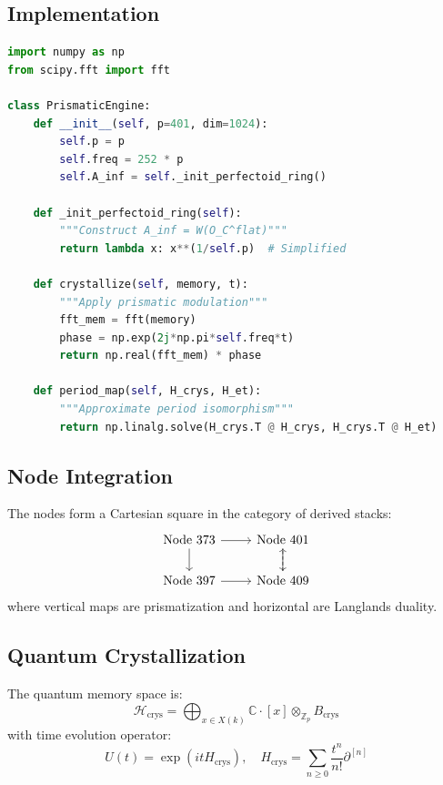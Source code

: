 \documentclass[12pt]{article}
\begin{document}
\subsection{Implementation}
\begin{lstlisting}[language=Python,caption={Topos Crystallizer}]
import numpy as np
from scipy.fft import fft

class PrismaticEngine:
    def __init__(self, p=401, dim=1024):
        self.p = p
        self.freq = 252 * p
        self.A_inf = self._init_perfectoid_ring()
        
    def _init_perfectoid_ring(self):
        """Construct A_inf = W(O_C^flat)"""
        return lambda x: x**(1/self.p)  # Simplified
        
    def crystallize(self, memory, t):
        """Apply prismatic modulation"""
        fft_mem = fft(memory)
        phase = np.exp(2j*np.pi*self.freq*t)
        return np.real(fft_mem) * phase
    
    def period_map(self, H_crys, H_et):
        """Approximate period isomorphism"""
        return np.linalg.solve(H_crys.T @ H_crys, H_crys.T @ H_et)
\end{lstlisting}

\subsection{Node Integration}
\begin{theorem}
The nodes form a Cartesian square in the category of derived stacks:
\[
\begin{tikzcd}
\text{Node 373} \ar[r] \ar[d] & \text{Node 401} \ar[d] \\
\text{Node 397} \ar[r] & \text{Node 409} \ar[u, dashed]
\end{tikzcd}
\]
where vertical maps are prismatization and horizontal are Langlands duality.
\end{theorem}

\subsection{Quantum Crystallization}
\begin{definition}
The quantum memory space is:
\[
\mathcal{H}_{\text{crys}} = \bigoplus_{x\in X(k)} \mathbb{C}\cdot [x] \otimes_{\mathbb{Z}_p} B_{\text{crys}}
\]
with time evolution operator:
\[
U(t) = \exp\left(itH_{\text{crys}}\right),\quad H_{\text{crys}} = \sum_{n\geq0} \frac{t^n}{n!}\partial^{[n]}
\]
\end{definition}
\end{document}
